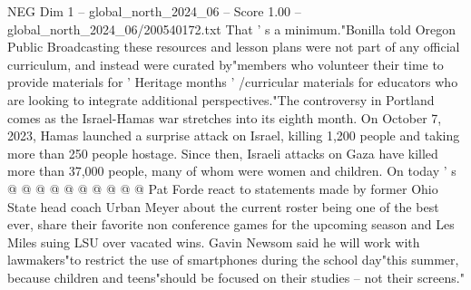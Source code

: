 \begin{textsample}{NEG Dim 1 – global\_north\_2024\_06 – Score 1.00 – global\_north\_2024\_06/200540172.txt}
That ' s a minimum."Bonilla told Oregon Public Broadcasting these resources and lesson plans were not part of any official curriculum, and instead were curated by"members who volunteer their time to provide materials for ' Heritage months ' /curricular materials for educators who are looking to integrate additional perspectives."The controversy in Portland comes as the Israel-Hamas war stretches into its eighth month.
On October 7, 2023, Hamas launched a surprise attack on Israel, killing 1,200 people and taking more than 250 people hostage.
Since then, Israeli attacks on Gaza have killed more than 37,000 people, many of whom were women and children.
On today ' s @ @ @ @ @ @ @ @ @ @ Pat Forde react to statements made by former Ohio State head coach Urban Meyer about the current roster being one of the best ever, share their favorite non conference games for the upcoming season and Les Miles suing LSU over vacated wins.
Gavin Newsom said he will work with lawmakers"to restrict the use of smartphones during the school day"this summer, because children and teens"should be focused on their studies -- not their screens."

\end{textsample}
